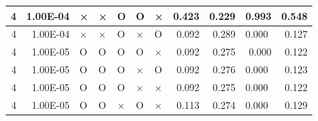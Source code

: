 \documentclass[11pt]{article}
\begin{document}
\begin{longtable}[h]{|r|r|l|l|l|l|l|r|r|l|r|}
4                                 & 1.00E-04                         & ×                                & ×                                & O                                & O                                & ×                                 & 0.423                             & 0.229                             & \multicolumn{1}{r|}{0.993}         & 0.548                               \\ \hline
4                                 & 1.00E-04                         & ×                                & ×                                & O                                & ×                                & O                                 & 0.092                             & 0.289                             & 0.000                              & 0.127                               \\ \hline
4                                 & 1.00E-05                         & O                                & O                                & O                                & O                                & ×                                 & 0.092                             & 0.275                             & \multicolumn{1}{r|}{0.000}         & 0.122                               \\ \hline
4                                 & 1.00E-05                         & O                                & O                                & O                                & ×                                & O                                 & 0.092                             & 0.276                             & 0.000                              & 0.123                               \\ \hline
4                                 & 1.00E-05                         & O                                & O                                & O                                & ×                                & ×                                 & 0.092                             & 0.275                             & 0.000                              & 0.122                               \\ \hline
4                                 & 1.00E-05                         & O                                & O                                & ×                                & O                                & ×                                 & 0.113                             & 0.274                             & 0.000                              & 0.129                               \\ \hline

\end{longtable}
\end{document}
